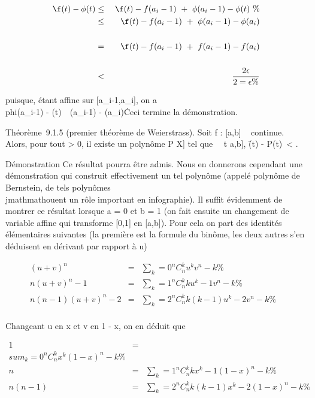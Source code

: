 \documentclass[]{article}
\begin{document}
\begin{align*} \f(t) -
\phi(t)& \leq& \f(t) -
f(a_i-1)\ +\
\phi(a_i-1) - \phi(t)\ \%&
\\ & \leq& \f(t) -
f(a_i-1)\ +\
\phi(a_i-1) - \phi(a_i)\\%
\\ & =& \f(t) -
f(a_i-1)\ +\
f(a_i-1) - f(a_i)\\%
\\ & \textless{}& 2 \epsilon
\over 2 = \epsilon \%& \\
\end{align*}

puisque, \phi étant affine sur {[}a_i-1,a_i{]}, on a
\\phi(a_i-1) -
\phi(t)\ \leq\
\phi(a_i-1) - \phi(a_i)\. Ceci
termine la démonstration.

Théorème~9.1.5 (premier théorème de Weierstrass). Soit f : {[}a,b{]} \rightarrow~ 
continue. Alors, pour tout \epsilon \textgreater{} 0, il existe un polynôme P \in
\mathbb{C}{[}X{]} tel que \forall~~t \in {[}a,b{]},
\f(t) - P(t)\
\textless{} \epsilon.

Démonstration Ce résultat pourra être admis. Nous en donnerons cependant
une démonstration qui construit effectivement un tel polynôme (appelé
polynôme de Bernstein, de tels polynômes \\jmathmathouent un rôle important en
infographie). Il suffit évidemment de montrer ce résultat lorsque a = 0
et b = 1 (on fait ensuite un changement de variable affine qui
transforme {[}0,1{]} en {[}a,b{]}). Pour cela on part des identités
élémentaires suivantes (la première est la formule du binôme, les deux
autres s'en déduisent en dérivant par rapport à u)

\begin{align*} (u + v)^n& =&
\sum _k=0^nC_
n^ku^kv^n-k \%&
\\ n(u + v)^n-1& =&
\sum _k=1^nC_
n^kku^k-1v^n-k \%&
\\ n(n - 1)(u + v)^n-2& =&
\sum _k=2^nC_
n^kk(k - 1)u^k-2v^n-k\%&
\\ \end{align*}

Changeant u en x et v en 1 - x, on en déduit que

\begin{align*} 1& =& \\sum
_k=0^nC_ n^kx^k(1 -
x)^n-k \%& \\ n& =&
\sum _k=1^nC_
n^kkx^k-1(1 - x)^n-k \%&
\\ n(n - 1)& =&
\sum _k=2^nC_
n^kk(k - 1)x^k-2(1 - x)^n-k\%&
\\ \end{align*}
\end{document}
